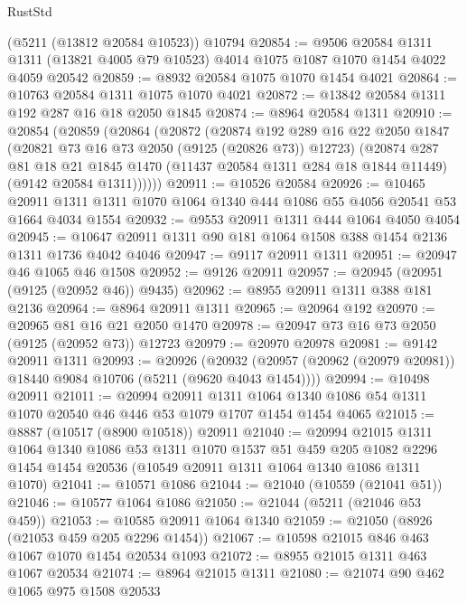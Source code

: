 \begin{lexlean}{RustStd}
\begin{coremodule}
    (@5211 (@13812 @20584 @10523))
    @10794
@20854 := @9506
    @20584
    @1311
    @1311
    (@13821 @4005 @79 @10523)
    @4014
    @1075
    @1087
    @1070
    @1454
    @4022
    @4059
    @20542
@20859 := @8932 @20584 @1075 @1070 @1454 @4021
@20864 := @10763 @20584 @1311 @1075 @1070 @4021
@20872 := @13842 @20584 @1311 @192 @287 @16 @18 @2050 @1845
@20874 := @8964 @20584 @1311
@20910 := @20854
    (@20859
      (@20864
        (@20872
          (@20874
            @192
            @289
            @16
            @22
            @2050
            @1847
            (@20821 @73 @16 @73 @2050 (@9125 (@20826 @73)) @12723)
            (@20874
              @287
              @81
              @18
              @21
              @1845
              @1470
              (@11437 @20584 @1311 @284 @18 @1844 @11449)
              (@9142 @20584 @1311))))))
@20911 := @10526 @20584
@20926 := @10465
    @20911
    @1311
    @1311
    @1070
    @1064
    @1340
    @444
    @1086
    @55
    @4056
    @20541
    @53
    @1664
    @4034
    @1554
@20932 := @9553 @20911 @1311 @444 @1064 @4050 @4054
@20945 := @10647 @20911 @1311 @90 @181 @1064 @1508 @388 @1454 @2136 @1311 @1736 @4042 @4046
@20947 := @9117 @20911 @1311
@20951 := @20947 @46 @1065 @46 @1508
@20952 := @9126 @20911
@20957 := @20945 (@20951 (@9125 (@20952 @46)) @9435)
@20962 := @8955 @20911 @1311 @388 @181 @2136
@20964 := @8964 @20911 @1311
@20965 := @20964 @192
@20970 := @20965 @81 @16 @21 @2050 @1470
@20978 := @20947 @73 @16 @73 @2050 (@9125 (@20952 @73)) @12723
@20979 := @20970 @20978
@20981 := @9142 @20911 @1311
@20993 := @20926
    (@20932 (@20957 (@20962 (@20979 @20981)) @18440 @9084 @10706 (@5211 (@9620 @4043 @1454))))
@20994 := @10498 @20911
@21011 := @20994
    @20911
    @1311
    @1064
    @1340
    @1086
    @54
    @1311
    @1070
    @20540
    @46
    @446
    @53
    @1079
    @1707
    @1454
    @1454
    @4065
@21015 := @8887 (@10517 (@8900 @10518)) @20911
@21040 := @20994
    @21015
    @1311
    @1064
    @1340
    @1086
    @53
    @1311
    @1070
    @1537
    @51
    @459
    @205
    @1082
    @2296
    @1454
    @1454
    @20536
    (@10549 @20911 @1311 @1064 @1340 @1086 @1311 @1070)
@21041 := @10571 @1086
@21044 := @21040 (@10559 (@21041 @51))
@21046 := @10577 @1064 @1086
@21050 := @21044 (@5211 (@21046 @53 @459))
@21053 := @10585 @20911 @1064 @1340
@21059 := @21050 (@8926 (@21053 @459 @205 @2296 @1454))
@21067 := @10598 @21015 @846 @463 @1067 @1070 @1454 @20534 @1093
@21072 := @8955 @21015 @1311 @463 @1067 @20534
@21074 := @8964 @21015 @1311
@21080 := @21074 @90 @462 @1065 @975 @1508 @20533

\end{coremodule}
\end{lexlean}
